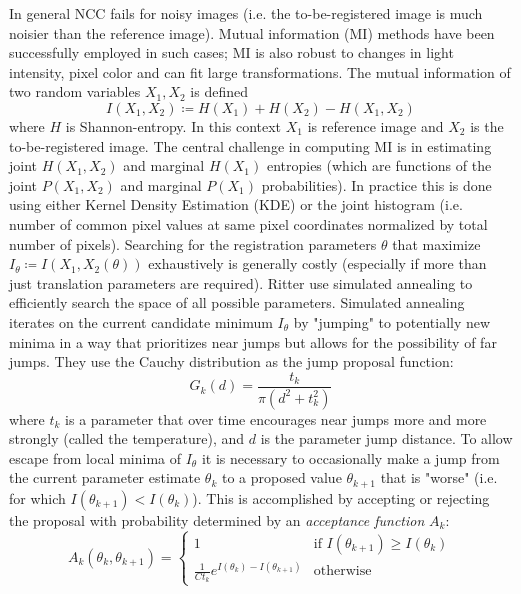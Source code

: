 In general NCC fails for noisy images (i.e. the to-be-registered image is much noisier than the reference image).
%
Mutual information (MI) methods have been successfully employed in such cases; MI is also robust to changes in light intensity, pixel color and can fit large transformations.
%
The mutual information of two random variables \(X_1, X_2\) is defined
\[
	I (X_1,X_2) \coloneqq H (X_1)+H (X_2)-H (X_1,X_2)
\]
where \(H\) is Shannon-entropy.
%
In this context \(X_1\) is reference image and \(X_2\) is the to-be-registered image.
%
The central challenge in computing MI is in estimating joint \(H(X_1,X_2)\) and marginal \(H(X_1)\) entropies (which are functions of the joint \(P(X_1,X_2)\) and marginal \(P(X_1)\) probabilities).
%
In practice this is done using either Kernel Density Estimation (KDE) or the joint histogram (i.e. number of common pixel values at same pixel coordinates normalized by total number of pixels).
%
Searching for the registration parameters \(\theta\) that maximize \(I_{\theta} \coloneqq I(X_1,X_2(\theta))\) exhaustively is generally costly (especially if more than just translation parameters are required).
%
Ritter \etal\cite{ritter1999} use simulated annealing to efficiently search the space of all possible parameters.
%
Simulated annealing iterates on the current candidate minimum \(I_{\theta}\) by "jumping" to potentially new minima in a way that prioritizes near jumps but allows for the possibility of far jumps.
%
They use the Cauchy distribution as the jump proposal function:
\[
	G_k(d) = \frac{t_k}{\pi \left( d^2 + t_k^2 \right)}
\]
where \(t_k\) is a parameter that over time encourages near jumps more and more strongly (called the temperature), and \(d\) is the parameter jump distance.
%
To allow escape from local minima of \(I_{\theta}\) it is necessary to occasionally make a jump from the current parameter estimate \(\theta_k\) to a proposed value \(\theta_{k+1}\) that is "worse" (i.e. for which \(I(\theta_{k+1}) < I(\theta_{k}) \)).
%
This is accomplished by accepting or rejecting the proposal with probability determined by an \textit{acceptance function} \(A_k\):
\[
	A_k(\theta_{k}, \theta_{k+1}) = \begin{cases}
		1                                                  & \text{if } I(\theta_{k+1}) \geq I(\theta_{k}) \\
		\frac{1}{C t_k}e^{I(\theta_{k}) - I(\theta_{k+1})} & \text{otherwise}
	\end{cases}
\]

